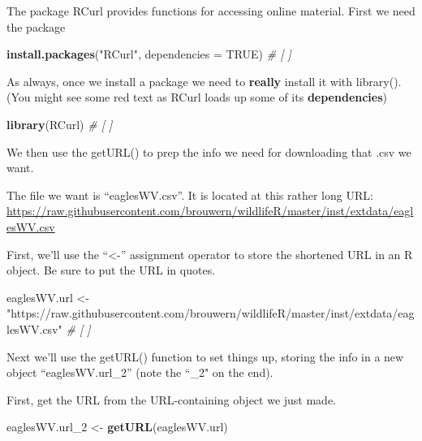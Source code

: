 \documentclass[]{book}
\newenvironment{Shaded}{\begin{snugshade}}{\end{snugshade}}
\newcommand{\KeywordTok}[1]{\textcolor[rgb]{0.13,0.29,0.53}{\textbf{#1}}}
\newcommand{\DataTypeTok}[1]{\textcolor[rgb]{0.13,0.29,0.53}{#1}}
\newcommand{\DecValTok}[1]{\textcolor[rgb]{0.00,0.00,0.81}{#1}}
\newcommand{\StringTok}[1]{\textcolor[rgb]{0.31,0.60,0.02}{#1}}
\newcommand{\CommentTok}[1]{\textcolor[rgb]{0.56,0.35,0.01}{\textit{#1}}}
\newcommand{\OtherTok}[1]{\textcolor[rgb]{0.56,0.35,0.01}{#1}}
\newcommand{\NormalTok}[1]{#1}
\theoremstyle{definition}
\theoremstyle{definition}
\theoremstyle{definition}
\theoremstyle{remark}
\begin{document}
The package RCurl provides functions for accessing online material.
First we need the package

\begin{Shaded}
\begin{Highlighting}[]
\KeywordTok{install.packages}\NormalTok{(}\StringTok{"RCurl"}\NormalTok{, }\DataTypeTok{dependencies =} \OtherTok{TRUE}\NormalTok{) }\CommentTok{# [ ]}
\end{Highlighting}
\end{Shaded}

As always, once we install a package we need to \textbf{really} install
it with library(). (You might see some red text as RCurl loads up some
of its \textbf{dependencies})

\begin{Shaded}
\begin{Highlighting}[]
\KeywordTok{library}\NormalTok{(RCurl) }\CommentTok{# [ ]}
\end{Highlighting}
\end{Shaded}

We then use the getURL() to prep the info we need for downloading that
.csv we want.

The file we want is ``eaglesWV.csv''. It is located at this rather long
URL:\\
\url{https://raw.githubusercontent.com/brouwern/wildlifeR/master/inst/extdata/eaglesWV.csv}

First, we'll use the ``\textless{}-'' assignment operator to store the
shortened URL in an R object. Be sure to put the URL in quotes.

\begin{Shaded}
\begin{Highlighting}[]
\NormalTok{eaglesWV.url <-}\StringTok{ "https://raw.githubusercontent.com/brouwern/wildlifeR/master/inst/extdata/eaglesWV.csv"} \CommentTok{# [ ]}
\end{Highlighting}
\end{Shaded}

Next we'll use the getURL() function to set things up, storing the info
in a new object ``eaglesWV.url\_2'' (note the ``\_2" on the end).

First, get the URL from the URL-containing object we just made.

\begin{Shaded}
\begin{Highlighting}[]
\NormalTok{eaglesWV.url_}\DecValTok{2}\NormalTok{ <-}\StringTok{ }\KeywordTok{getURL}\NormalTok{(eaglesWV.url)}
\end{Highlighting}
\end{Shaded}
\end{document}
